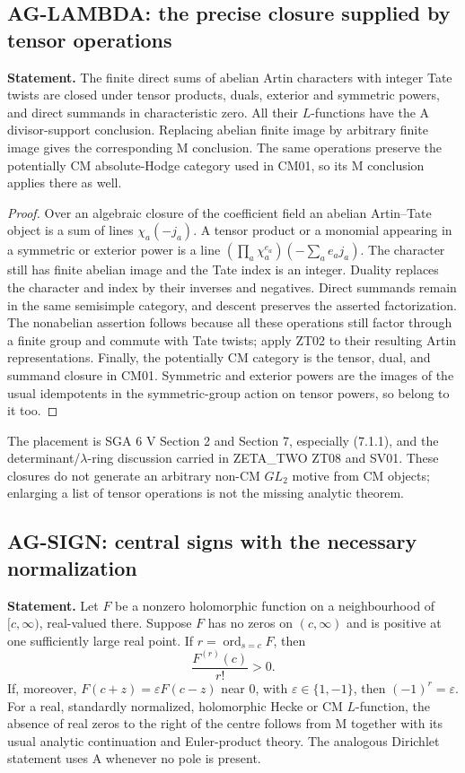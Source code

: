 \documentclass[11pt,a4paper]{article}
\begin{document}
\subsection{AG-LAMBDA: the precise closure supplied by tensor operations}
\label{ag:lambda}

\textbf{Statement.} The finite direct sums of abelian Artin characters with
integer Tate twists are closed under tensor products, duals, exterior and
symmetric powers, and direct summands in characteristic zero. All their
$L$-functions have the A divisor-support conclusion. Replacing abelian
finite image by arbitrary finite image gives the corresponding M conclusion.
The same operations preserve the potentially CM absolute-Hodge category
used in CM01, so its M conclusion applies there as well.

\begin{proof}
Over an algebraic closure of the coefficient field an abelian Artin--Tate
object is a sum of lines $\chi_a(-j_a)$. A tensor product or a monomial
appearing in a symmetric or exterior power is a line
$(\prod_a\chi_a^{e_a})(-\sum_a e_aj_a)$. The character still has finite
abelian image and the Tate index is an integer. Duality replaces the
character and index by their inverses and negatives. Direct summands remain
in the same semisimple category, and descent preserves the asserted
factorization. The nonabelian assertion follows because all these
operations still factor through a finite group and commute with Tate
twists; apply ZT02 to their resulting Artin representations. Finally, the
potentially CM category is the tensor, dual, and summand closure in CM01.
Symmetric and exterior powers are the images of the usual idempotents in
the symmetric-group action on tensor powers, so belong to it too.
\end{proof}

The placement is SGA 6 V Section 2 and Section 7, especially (7.1.1),
and the determinant/$\lambda$-ring discussion carried in ZETA\_TWO ZT08
and SV01. These closures do not generate an arbitrary non-CM $GL_2$
motive from CM objects; enlarging a list of tensor operations is not the
missing analytic theorem.

\subsection{AG-SIGN: central signs with the necessary normalization}
\label{ag:sign}

\textbf{Statement.} Let $F$ be a nonzero holomorphic function on a
neighbourhood of $[c,\infty)$, real-valued there. Suppose $F$ has no zeros
on $(c,\infty)$ and is positive at one sufficiently large real point.
If $r=\operatorname{ord}_{s=c}F$, then
\[
 \frac{F^{(r)}(c)}{r!}>0.
\]
If, moreover, $F(c+z)=\varepsilon F(c-z)$ near $0$, with
$\varepsilon\in\{1,-1\}$, then $(-1)^r=\varepsilon$.
For a real, standardly normalized, holomorphic Hecke or CM $L$-function,
the absence of real zeros to the right of the centre follows from M
together with its usual analytic continuation and Euler-product theory.
The analogous Dirichlet statement uses A whenever no pole is present.
\end{document}
